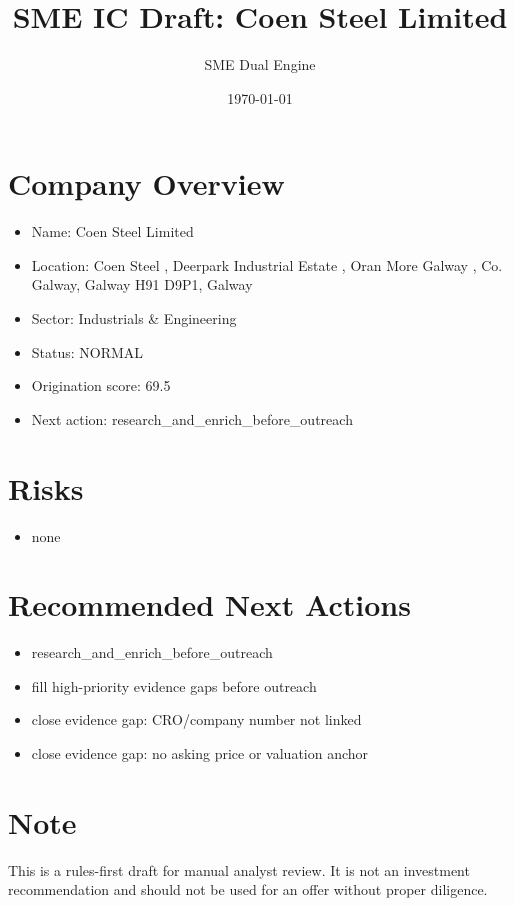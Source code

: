 \documentclass[11pt,a4paper]{article}
\title{SME IC Draft: Coen Steel Limited}
\author{SME Dual Engine}
\date{\today}
\begin{document}
\maketitle
\section*{Company Overview}
\begin{itemize}[leftmargin=1.4em]
\item Name: Coen Steel Limited
\item Location: Coen Steel , Deerpark Industrial Estate , Oran More Galway , Co. Galway, Galway H91 D9P1, Galway
\item Sector: Industrials \& Engineering
\item Status: NORMAL
\item Origination score: 69.5
\item Next action: research\_and\_enrich\_before\_outreach
\end{itemize}
\section*{Risks}
\begin{itemize}[leftmargin=1.4em]
\item none
\end{itemize}
\section*{Recommended Next Actions}
\begin{itemize}[leftmargin=1.4em]
\item research\_and\_enrich\_before\_outreach
\item fill high-priority evidence gaps before outreach
\item close evidence gap: CRO/company number not linked
\item close evidence gap: no asking price or valuation anchor
\end{itemize}
\section*{Note}
This is a rules-first draft for manual analyst review. It is not an investment
recommendation and should not be used for an offer without proper diligence.
\end{document}
